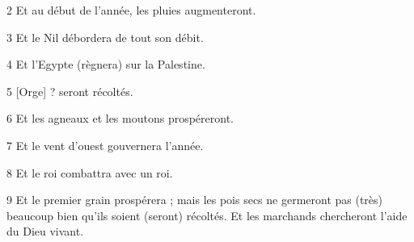 \par 2 Et au début de l'année, les pluies augmenteront.

\par 3 Et le Nil débordera de tout son débit.

\par 4 Et l'Egypte (règnera) sur la Palestine.

\par 5 [Orge] ? seront récoltés.

\par 6 Et les agneaux et les moutons prospéreront.

\par 7 Et le vent d'ouest gouvernera l'année.

\par 8 Et le roi combattra avec un roi.

\par 9 Et le premier grain prospérera ; mais les pois secs ne germeront pas (très) beaucoup bien qu'ils soient (seront) récoltés. Et les marchands chercheront l'aide du Dieu vivant.



